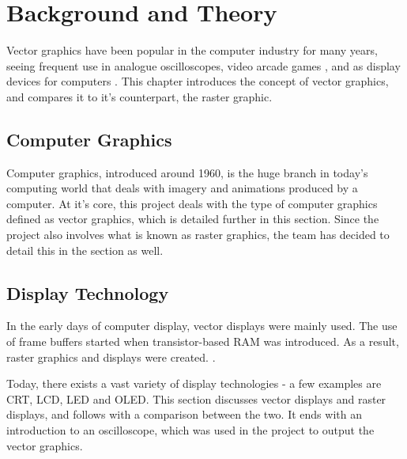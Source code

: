 \chapter{Background and Theory}
\label{sec:background}

Vector graphics have been popular in the computer industry for many years,
seeing frequent use in analogue oscilloscopes, video arcade games \cite{astroids},
and as display devices for computers \cite{ibm2250}\cite{tektronix4010}. 
This chapter introduces the concept of vector graphics, and compares it to it's counterpart, the raster graphic.

\section{Computer Graphics}
Computer graphics, introduced around 1960\cite[sec. 1.1.1]{graphics-visualization-algorithms}, is the huge branch in today's computing world that deals with imagery and animations produced by a computer.
At it's core, this project deals with the type of computer graphics defined as vector graphics, which is detailed further in this section. 
Since the project also involves what is known as raster graphics, the team has decided to detail this in the section as well.





\section{Display Technology}
In the early days of computer display, vector displays were mainly used.
The use of frame buffers started when transistor-based RAM was introduced.
As a result, raster graphics and displays were created. \cite[sec. 1.1]{graphics-visualization-algorithms}.

Today, there exists a vast variety of display technologies - a few examples are CRT, LCD, LED and OLED.
This section discusses vector displays and raster displays, and follows with a comparison between the two. It ends with an introduction to an oscilloscope, which was used in the project to output the vector graphics.






